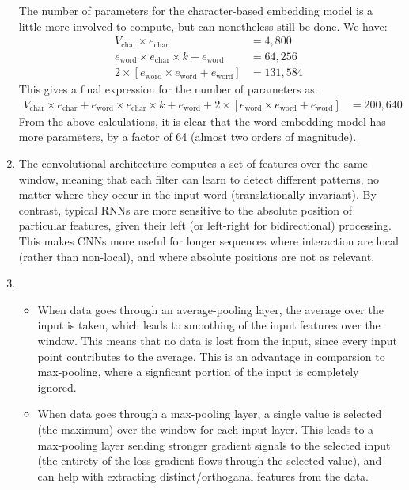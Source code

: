 \documentclass[12pt]{article}
\begin{document}
\begin{enumerate}[label=(\alph*)]
  The number of parameters for the character-based embedding model is a little more involved to compute, but can nonetheless still be done. We have:
  \begin{align*}
    V_{\text{char}} \times e_{\text{char}} &= 4,800 \tag{Character Embedding Parameters} \\
    e_{\text{word}} \times e_{\text{char}} \times k + e_{\text{word}}  &= 64,256 \tag{Convolution Parameters} \\
    2 \times [e_{\text{word}} \times e_{\text{word}} + e_{\text{word}}] &= 131,584 \tag{Highway Network Parameters}
  \end{align*}
  This gives a final expression for the number of parameters as:
  \begin{align*}
    V_{\text{char}} \times e_{\text{char}} + e_{\text{word}} \times e_{\text{char}} \times k + e_{\text{word}} + 2 \times [e_{\text{word}} \times e_{\text{word}} + e_{\text{word}}]  &= 200,640
  \end{align*}
  From the above calculations, it is clear that the word-embedding model has more parameters, by a factor of 64 (almost two orders of magnitude).
  \item The convolutional architecture computes a set of features over the same window, meaning that each filter can learn to detect different patterns, no matter where they occur in the input word (translationally invariant). By contrast, typical RNNs are more sensitive to the absolute position of particular features, given their left (or left-right for bidirectional) processing. This makes CNNs more useful for longer sequences where interaction are local (rather than non-local), and where absolute positions are not as relevant.
  \item
    \begin{itemize}
      \item When data goes through an average-pooling layer, the average over the input is taken, which leads to smoothing of the input features over the window. This means that no data is lost from the input, since every input point contributes to the average. This is an advantage in comparsion to max-pooling, where a signficant portion of the input is completely ignored.
      \item When data goes through a max-pooling layer, a single value is selected (the maximum) over the window for each input layer. This leads to a max-pooling layer sending stronger gradient signals to the selected input (the entirety of the loss gradient flows through the selected value), and can help with extracting distinct/orthoganal features from the data. 

\end{itemize}
\end{enumerate}
\end{document}
